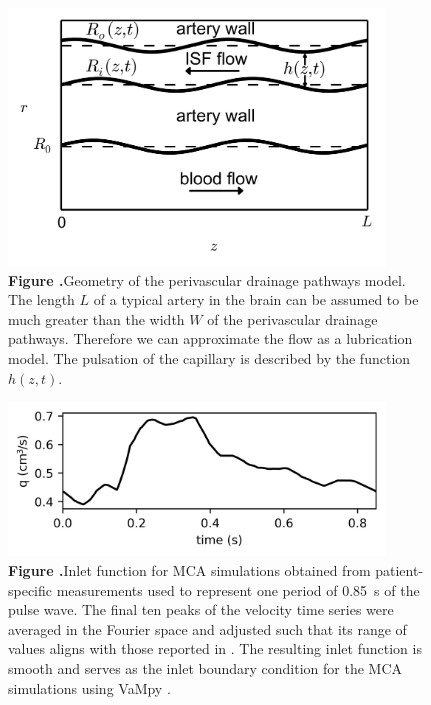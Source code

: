 \documentclass{frontiersFPHY} %
\begin{document}
\begin{figure}[h!]
\centering
\includegraphics[width=10cm]{figures/fig01.jpg}
\textbf{\label{fig:pvs_model} Figure .}{Geometry of the perivascular drainage pathways model. The length $L$ of a typical artery in the brain can be assumed to be much greater than the width $W$ of the perivascular drainage pathways. Therefore we can approximate the flow as a lubrication model. The pulsation of the capillary is described by the function $h(z,t)$.}
\end{figure}

\begin{figure}[h!]
\centering
\includegraphics[width=10cm]{figures/fig02.jpg}
\textbf{\label{fig:inlet} Figure .}{Inlet function for MCA simulations obtained from patient-specific measurements used to represent one period of \SI{0.85}{\second} of the pulse wave. The final ten peaks of the velocity time series were averaged in the Fourier space and adjusted such that its range of values aligns with those reported in \cite{Olufsen2002}. The resulting inlet function is smooth and serves as the inlet boundary condition for the MCA simulations using VaMpy \cite{Diem2016a}.}
\end{figure}
\end{document}
